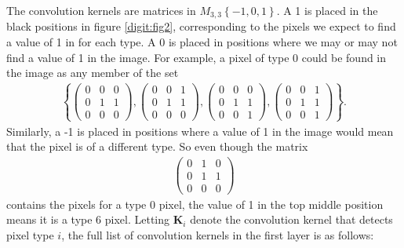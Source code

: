 \documentclass{somasmsc}
\begin{document}
The convolution kernels are matrices in $M_{3,3}\left\{-1,0,1\right\}$. A 1 is placed in the black positions in figure \ref{digit:fig2}, corresponding to the pixels we expect to find a value of 1 in for each type. A 0 is placed in positions where we may or may not find a value of 1 in the image. For example, a pixel of type 0 could be found in the image as any member of the set
\begin{align*}
    \left\{
    \begin{pmatrix}
        0 & 0 & 0 \\
        0 & 1 & 1 \\
        0 & 0 & 0
    \end{pmatrix},
    \begin{pmatrix}
        0 & 0 & 1 \\
        0 & 1 & 1 \\
        0 & 0 & 0
    \end{pmatrix},
    \begin{pmatrix}
        0 & 0 & 0 \\
        0 & 1 & 1 \\
        0 & 0 & 1
    \end{pmatrix},
    \begin{pmatrix}
        0 & 0 & 1 \\
        0 & 1 & 1 \\
        0 & 0 & 1
    \end{pmatrix}
    \right\}.
\end{align*}
Similarly, a -1 is placed in positions where a value of 1 in the image would mean that the pixel is of a different type. So even though the matrix
\begin{align*}
    \begin{pmatrix}
        0 & 1 & 0 \\
        0 & 1 & 1 \\
        0 & 0 & 0
    \end{pmatrix}
\end{align*}
contains the pixels for a type 0 pixel, the value of 1 in the top middle position means it is a type 6 pixel. Letting $\mathbf{K}_i$ denote the convolution kernel that detects pixel type $i$, the full list of convolution kernels in the first layer is as follows:
\end{document}

